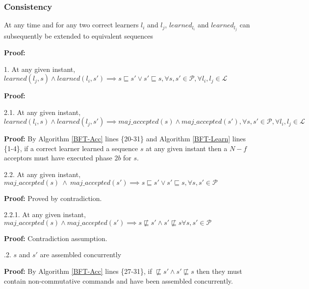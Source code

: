 \subsubsection{Consistency}
\begin{theorem}At any time and for any two correct learners $l_i$ and $l_j$, $learned_{l_i}$ and $learned_{l_j}$ can subsequently be extended to equivalent sequences \par
\end{theorem} 
\textbf{Proof:} \par
1. At any given instant, $learned(l_j,s) \land learned(l_i,s') \implies s \sqsubseteq s' \lor s' \sqsubseteq s, \forall s,s' \in \mathcal{P}, \forall l_i,l_j \in \mathcal{L}$ \par
\indent\indent\textbf{Proof:} \par
\indent\indent\indent\parbox{\linewidth}{2.1. At any given instant, $learned(l_i,s) \land learned(l_j,s') \implies maj\_accepted(s) \land maj\_accepted(s'), \forall s,s' \in \mathcal{P}, \forall l_i,l_j \in \mathcal{L}$ } \par
\indent\indent\indent\indent\parbox{\linewidth}{\textbf{Proof:} By Algorithm \ref{BFT-Acc} lines \{20-31\} and Algorithm \ref{BFT-Learn} lines \{1-4\}, if a correct learner learned a sequence $s$ at any given instant then a $N-f$ acceptors must have executed phase $2b$ for $s$.}\par
\indent\indent\indent\parbox{\linewidth}{2.2. At any given instant, $maj\_accepted(s)\ \land\ maj\_accepted(s') \implies s \sqsubseteq s' \lor s' \sqsubseteq s, \forall s,s' \in \mathcal{P}$}\par
\indent\indent\indent\indent\textbf{Proof:} Proved by contradiction.\par
\indent\indent\indent\indent\indent\parbox{\linewidth}{2.2.1. At any given instant, $maj\_accepted(s) \land maj\_accepted(s') \implies s \not\sqsubseteq s' \land s' \not\sqsubseteq s \forall s,s' \in \mathcal{P}$} \par
\indent\indent\indent\indent\indent\indent\textbf{Proof:} Contradiction assumption.\par
\indent\indent\indent\indent{}.2. $s$ and $s'$ are assembled concurrently \par
\indent\indent\indent\indent\indent\indent \parbox{\linewidth}{\textbf{Proof:} By Algorithm \ref{BFT-Acc} lines \{27-31\}, if $\not\sqsubseteq s' \land s' \not\sqsubseteq s$ then they must contain non-commutative commands and have been assembled concurrently.}\par
